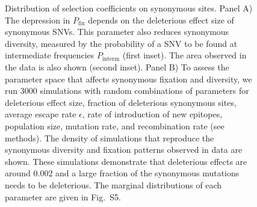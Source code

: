 \documentclass[11pt]{article}
\newcommand{\pfix}{P_{\mathrm{fix}}}
\newcommand{\marginals}{5}
\begin{document}
\begin{figure}
\begin{center}
\caption{Distribution of selection coefficients on synonymous sites. Panel A)
The depression in $\pfix$ depends on the deleterious effect size 
of synonymous SNVs. This parameter also reduces synonymous
diversity, measured by the probability of a SNV to be found at
intermediate frequencies $P_\mathrm{interm}$ (first inset). The area observed in
the data is also shown (second inset).
Panel B) To assess the parameter space that affects synonymous fixation and
diversity, we run 3000 simulations with random combinations of parameters for deleterious effect
size, fraction of deleterious synonymous sites, average escape rate $\epsilon$,
rate of introduction of new epitopes, population size, mutation rate, and
recombination rate (see methods). The density of simulations that reproduce
the synonymous diversity and fixation patterns observed in data are shown.
These simulations demonstrate that deleterious effects are around $0.002$
and a large fraction of the synonymous mutations needs to be
deleterious. The marginal distributions of each parameter are given in
Fig.~S\marginals.} 
\label{fig:simheat}
\end{center}
\end{figure}

\end{document}
